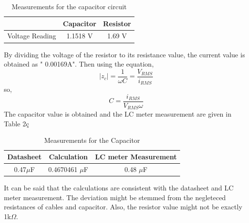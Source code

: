 \documentclass[letterpaper,12pt]{article}
\begin{document}
\begin{table}[H]
	\begin{center}
		\caption{Measurements for the capacitor circuit}
		\vspace{2mm}
		\begin{tabular}{||c | c | c||} 
		 \hline
		   & Capacitor & Resistor \\ [0.5ex] 
		 \hline\hline
		 Voltage Reading & 1.1518 V & 1.69 V  \\ 
		 \hline
		\end{tabular}
\end{center}
\end{table}
By dividing the voltage of the resistor to its resistance value, the current value is obtained as " 0.00169A".
Then using the equation,
\[|z_c| = \frac{1}{\omega C} = \frac{V_{RMS}}{i_{RMS}}\]
so,
\[C = \frac{i_{RMS}}{V_{RMS} \omega}
	\]
The capacitor value is obtained and the LC meter measurement are given in Table 2ç
\begin{table}[H]
	\begin{center}
		\caption{Measurements for the Capacitor}
		\vspace{2mm}
		\begin{tabular}{||c | c | c||} 
		 \hline
		   Datasheet & Calculation & LC meter Measurement \\ [0.5ex] 
		 \hline\hline
		 0.47\(\mu\)F & 0.4670461 \(\mu\)F & 0.48 \(\mu\)F  \\
		 \hline

		\end{tabular}
\end{center}
\end{table}
It can be said that the calculations are consistent with the datasheet and LC meter measurement. The deviation might be stemmed from the negleteced resistances of cables and capacitor. Also, the resistor value might not be exactly 1k\(\Omega\).
\end{document}
